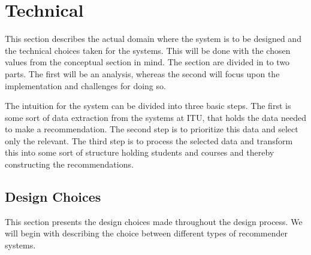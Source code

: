 \section{Technical}

This section describes the actual domain where the system is to be designed and the technical choices taken for the systems. This will be done with the chosen values from the conceptual section in mind. 
The section are divided in to two parts. The first will be an analysis, whereas the second will focus upon the implementation and challenges for doing so.\newline 

The intuition for the system can be divided into three basic steps. The first is some sort of data extraction from the systems at ITU, that holds the data needed to make a recommendation. The second step is to prioritize this data and select only the relevant. The third step is to process the selected data and transform this into some sort of structure holding students and courses and thereby constructing the recommendations.

\subsection{Design Choices}
This section presents the design choices made throughout the design process. We will begin with describing the choice between different types of recommender systems.
